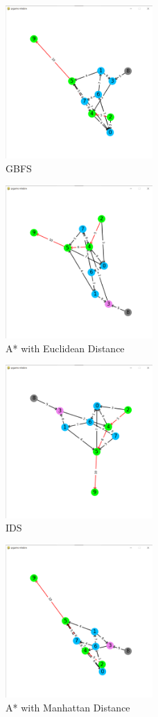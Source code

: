 \begin{figure}[h!]
    \centering
    \includegraphics[width=0.5\textwidth]{result/testcase5/greedy.png}
    \caption{GBFS}
\end{figure}
\begin{figure}[h!]
    \centering
    \includegraphics[width=0.5\textwidth]{result/testcase5/astar.png}
    \caption{A* with Euclidean Distance}
\end{figure}
\begin{figure}[h!]
    \centering
    \includegraphics[width=0.5\textwidth]{result/testcase5/ids.png}
    \caption{IDS}
\end{figure}
\begin{figure}[h!]
    \centering
    \includegraphics[width=0.5\textwidth]{result/testcase5/astar2.png}
    \caption{A* with Manhattan Distance}
\end{figure}
\clearpage

\pagebreak